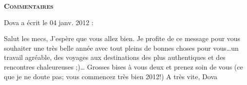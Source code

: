 \bigskip
\textbf{\textsc{Commentaires}}

\medskip
Dova a écrit le 04 janv. 2012 :
\begin{displayquote}
Salut les mecs,
J'espère que vous allez bien.
Je profite de ce message pour vous souhaiter une très belle année avec tout pleins de bonnes choses pour vous\dots un travail agréable, des voyages aux destinations des plus authentiques et des rencontres chaleureuses ;)\dots
Grosses bises à vous deux et prenez soin de vous (ce que je ne doute pas; vous commencez très bien 2012!)
A très vite,
Dova
\end{displayquote}

\vfill
